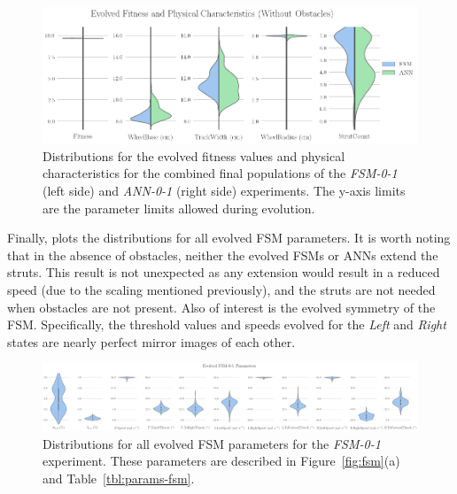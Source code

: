 \begin{figure}[!ht]
    \centering

    \includegraphics[width=\columnwidth]{figures/4-results/0-1-best_params.png}


    \caption{Distributions for the evolved fitness values and physical characteristics for the combined final populations of the \emph{FSM-0-1} (left side) and \emph{ANN-0-1} (right side) experiments. The y-axis limits are the parameter limits allowed during evolution.}
    \label{fig:0-1-best-params}


\end{figure}


Finally,  plots the distributions for all evolved FSM parameters.
%
It is worth noting that in the absence of obstacles, neither the evolved FSMs or ANNs extend the struts.
%
This result is not unexpected as any extension would result in a reduced speed (due to the scaling mentioned previously), and the struts are not needed when obstacles are not present.
%
Also of interest is the evolved symmetry of the FSM.
%
Specifically, the threshold values and speeds evolved for the \emph{Left} and \emph{Right} states are nearly perfect mirror images of each other.


\begin{figure}[!ht]
    \centering


    \includegraphics[width=\textwidth]{figures/4-results/FSM-0-1-best_params.png}


    \caption{Distributions for all evolved FSM parameters for the \emph{FSM-0-1} experiment. These parameters are described in Figure~\ref{fig:fsm}(a) and Table~\ref{tbl:params-fsm}.}
    \label{fig:FSM-best-params}
\end{figure}


